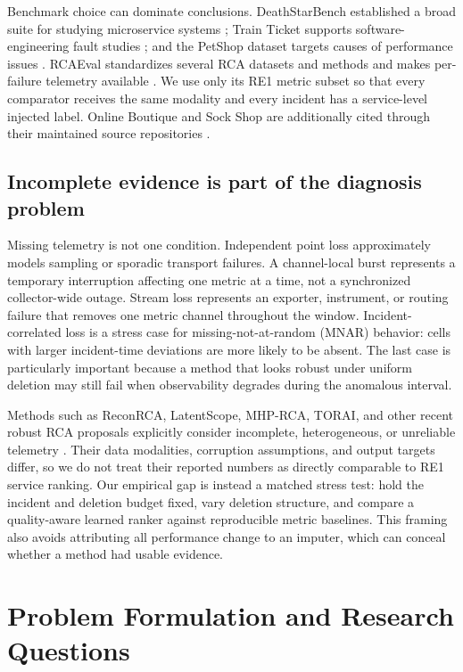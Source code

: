 \documentclass[runningheads]{llncs}
\begin{document}
Benchmark choice can dominate conclusions. DeathStarBench established a broad
suite for studying microservice systems \cite{deathstarbench2019}; Train Ticket
supports software-engineering fault studies \cite{trainticket2021}; and the
PetShop dataset targets causes of performance issues \cite{petshop2024}.
RCAEval standardizes several RCA datasets and methods and makes per-failure
telemetry available \cite{rcaeval2025}. We use only its RE1 metric subset so
that every comparator receives the same modality and every incident has a
service-level injected label. Online Boutique and Sock Shop are additionally
cited through their maintained source repositories
\cite{googleOnlineBoutique,weaveworksSockShop}.

\subsection{Incomplete evidence is part of the diagnosis problem}

Missing telemetry is not one condition. Independent point loss approximately
models sampling or sporadic transport failures. A channel-local burst represents
a temporary interruption affecting one metric at a time, not a synchronized
collector-wide outage. Stream loss represents an exporter,
instrument, or routing failure that removes one metric channel throughout the
window. Incident-correlated loss is a stress case for missing-not-at-random
(MNAR) behavior: cells with larger incident-time deviations are more likely to
be absent. The last case is particularly important because a method that looks
robust under uniform deletion may still fail when observability degrades during
the anomalous interval.

Methods such as ReconRCA, LatentScope, MHP-RCA, TORAI, and other recent robust
RCA proposals explicitly consider incomplete, heterogeneous, or unreliable
telemetry \cite{reconrca2025,latentscope2024,mhprca2026,torai2026,%
fukuda2025robust}. Their data modalities, corruption assumptions, and output
targets differ, so we do not treat their reported numbers as directly
comparable to RE1 service ranking. Our empirical gap is instead a matched
stress test: hold the incident and deletion budget fixed, vary deletion
structure, and compare a quality-aware learned ranker against reproducible
metric baselines. This framing also avoids attributing all performance change
to an imputer, which can conceal whether a method had usable evidence.

\section{Problem Formulation and Research Questions}
\end{document}
